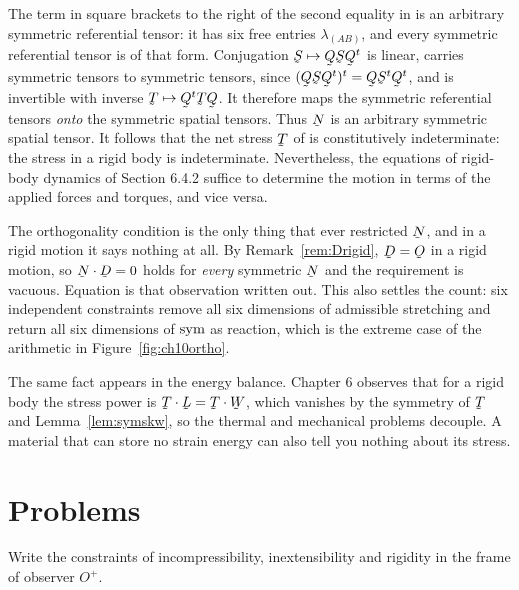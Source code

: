 The term in square brackets to the right of the second equality in
 is an arbitrary symmetric referential tensor: it has six free
entries $\lambda_{(AB)}$, and every symmetric referential tensor is of
that form. Conjugation $\bS\mapsto\bQ\bS\bQ^{t}$ is linear, carries
symmetric tensors to symmetric tensors, since
$(\bQ\bS\bQ^{t})^{t}=\bQ\bS^{t}\bQ^{t}$, and is invertible with inverse
$\bT\mapsto\bQ^{t}\bT\bQ$. It therefore maps the symmetric referential
tensors \emph{onto} the symmetric spatial tensors. Thus $\bN$ is an
arbitrary symmetric spatial tensor. It follows that the net stress $\bT$
of  is constitutively indeterminate: the stress in a rigid
body is indeterminate. Nevertheless, the equations of rigid-body dynamics
of Section 6.4.2 suffice to determine the motion in terms of the applied
forces and torques, and vice versa.

\begin{remark}\label{rem:ch10rigid}
The orthogonality condition  is the only thing that ever
restricted $\bN$, and in a rigid motion it says nothing at all. By
Remark~\ref{rem:Drigid}, $\bD=\Ob$ in a rigid motion, so
$\bN\cdot\bD=0$ holds for \emph{every} symmetric $\bN$ and the
requirement is vacuous. Equation  is that observation written
out. This also settles the count: six independent constraints remove all
six dimensions of admissible stretching and return all six dimensions of
$\operatorname{sym}$ as reaction, which is the extreme case of the arithmetic in
Figure~\ref{fig:ch10ortho}.

The same fact appears in the energy balance. Chapter 6 observes that for
a rigid body the stress power is $\bT\cdot\bL=\bT\cdot\bW$, which
vanishes by the symmetry of $\bT$ and Lemma~\ref{lem:symskw}, so the
thermal and mechanical problems decouple. A material that can store no
strain energy can also tell you nothing about its stress.
\end{remark}

\setcounter{problemenv}{0}
\section{Problems}\label{sec:problems:c10}

\begin{problem}
Write the constraints of incompressibility, inextensibility and rigidity
in the frame of observer $O^{+}$.
\end{problem}

